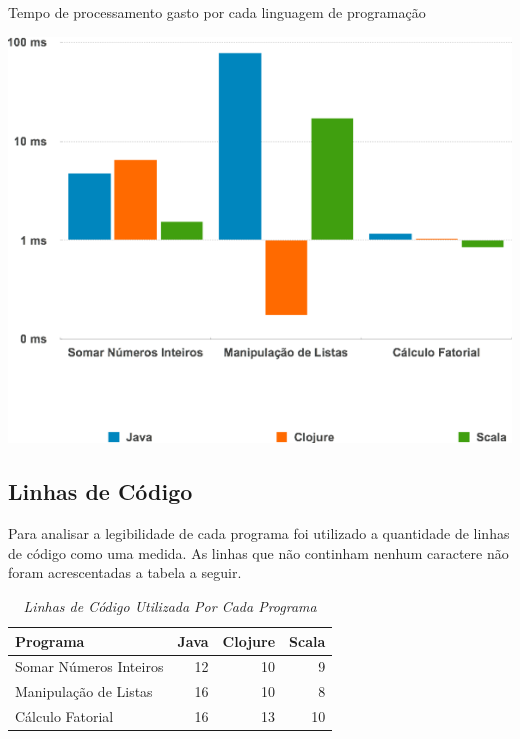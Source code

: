     \begin{grafico}[H]
      \setlength{\abovecaptionskip}{5pt}
      \setlength{\belowcaptionskip}{0pt}
      \caption[Tempo de processamento gasto por cada linguagem de programação]
        {Tempo de processamento gasto por cada linguagem de programação}
      \centering
      \includegraphics[width=1\textwidth]{imagem/graficos/grafico-programas.png}
      \captionsetup[grafico]{justification=centering}
    \end{grafico}

  \subsection{Linhas de Código}

    Para analisar a legibilidade de cada programa foi utilizado a quantidade de linhas de código como uma medida. As linhas que não continham nenhum caractere não foram acrescentadas a tabela a seguir.

    \begin{table}[htb] %
       \centering   %
       \large       %
       \setlength{\arrayrulewidth}{2\arrayrulewidth}  %
       \setlength{\belowcaptionskip}{10pt}  %
       \caption{\it Linhas de Código Utilizada Por Cada Programa}
       \begin{tabular}{|l|r|r|r|} %
          \hline
          Programa & Java & Clojure & Scala \\
          \hline \hline
          Somar Números Inteiros & 12 & 10 & 9 \\
          \hline
          Manipulação de Listas & 16 & 10 & 8 \\
          \hline
          Cálculo Fatorial & 16 & 13 & 10 \\
          \hline
       \end{tabular}
    \end{table}

